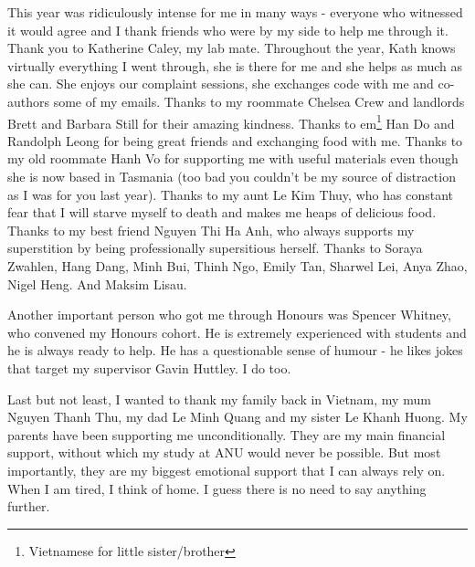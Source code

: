 This year was ridiculously intense for me in many ways - everyone who witnessed it would agree and I thank friends who were by my side to help me through it. Thank you to Katherine Caley, my lab mate. Throughout the year, Kath knows virtually everything I went through, she is there for me and she helps as much as she can. She enjoys our complaint sessions, she exchanges code with me and co-authors some of my emails. Thanks to my roommate Chelsea Crew and landlords Brett and Barbara Still for their amazing kindness. Thanks to em\footnote{Vietnamese for little sister/brother} Han Do and Randolph Leong for being great friends and exchanging food with me. Thanks to my old roommate Hanh Vo for supporting me with useful materials even though she is now based in Tasmania (too bad you couldn't be my source of distraction as I was for you last year). Thanks to my aunt Le Kim Thuy, who has constant fear that I will starve myself to death and makes me heaps of delicious food. Thanks to my best friend Nguyen Thi Ha Anh, who always supports my superstition by being professionally supersitious herself. Thanks to Soraya Zwahlen, Hang Dang, Minh Bui, Thinh Ngo, Emily Tan, Sharwel Lei, Anya Zhao, Nigel Heng. And Maksim Lisau. 

Another important person who got me through Honours was Spencer Whitney, who convened my Honours cohort. He is extremely experienced with students and he is always ready to help. He has a questionable sense of humour - he likes jokes that target my supervisor Gavin Huttley. I do too. 

Last but not least, I wanted to thank my family back in Vietnam, my mum Nguyen Thanh Thu, my dad Le Minh Quang and my sister Le Khanh Huong. My parents have been supporting me unconditionally. They are my main financial support, without which my study at ANU would never be possible. But most importantly, they are my biggest emotional support that I can always rely on. When I am tired, I think of home. I guess there is no need to say anything further. 